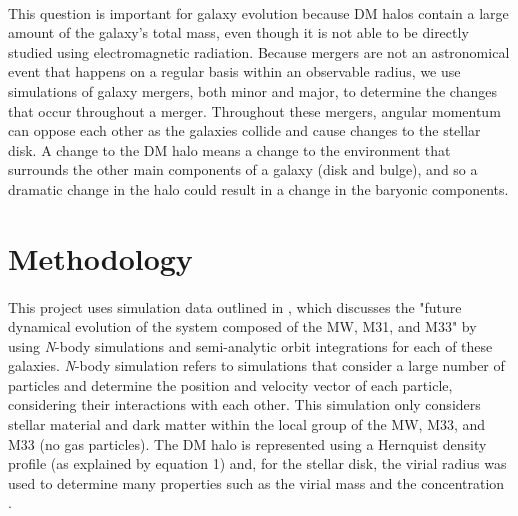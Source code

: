\documentclass[fleqn,usenatbib]{mnras}
\begin{document}
\paragraph{} This question is important for galaxy evolution because DM halos contain a large amount of the galaxy's total mass, even though it is not able to be directly studied using electromagnetic radiation. Because mergers are not an astronomical event that happens on a regular basis within an observable radius, we use simulations of galaxy mergers, both minor and major, to determine the changes that occur throughout a merger. Throughout these mergers, angular momentum can oppose each other as the galaxies collide and cause changes to the stellar disk. A change to the DM halo means a change to the environment that surrounds the other main components of a galaxy (disk and bulge), and so a dramatic change in the halo could result in a change in the baryonic components.


\section{Methodology}

\paragraph{} This project uses simulation data outlined in \cite{Marel+2012}, which discusses the "future dynamical evolution of the system composed of the MW, M31, and M33" \citep{Marel+2012} by using \textit{N}-body simulations and semi-analytic orbit integrations for each of these galaxies. \textit{N}-body simulation refers to simulations that consider a large number of particles and determine the position and velocity vector of each particle, considering their interactions with each other. This simulation only considers stellar material and dark matter within the local group of the MW, M33, and M33 (no gas particles). The DM halo is represented using a Hernquist density profile (as explained by equation 1) and, for the stellar disk, the virial radius was used to determine many properties such as the virial mass and the concentration \citep{Marel+2012}.
\end{document}
